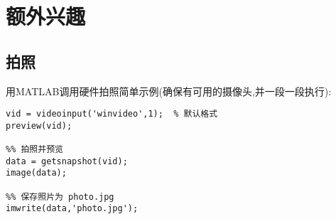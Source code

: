 \section{额外兴趣}

\subsection{拍照}
用MATLAB调用硬件拍照简单示例(确保有可用的摄像头,并一段一段执行):

\vspace{-0.8cm}
\begin{lstlisting}[caption = 拍照]
%% 打开摄像头
vid = videoinput('winvideo',1);  % 默认格式
preview(vid);

%% 拍照并预览
data = getsnapshot(vid);
image(data);

%% 保存照片为 photo.jpg
imwrite(data,'photo.jpg');
\end{lstlisting}






